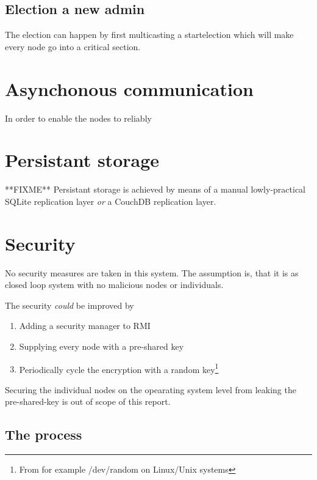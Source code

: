 \documentclass[10pt,a4paper]{article}
\begin{document}
\subsection{Election a new admin}
The election can happen by first multicasting a startelection which will make every node go into a critical section.

\section{Asynchonous communication}
In order to enable the nodes to reliably 

\section{Persistant storage}
**FIXME** Persistant storage is achieved by means of a manual lowly-practical SQLite replication layer \emph{or} a CouchDB replication layer.

\section{Security}
No security measures are taken in this system. The assumption is, that it is as closed loop system with no malicious nodes or individuals.

The security \emph{could} be improved by 
\begin{enumerate}
\item Adding a security manager to RMI
\item Supplying every node with a pre-shared key
\item Periodically cycle the encryption with a random key\footnote{From for example /dev/random on Linux/Unix systems}
\end{enumerate}
Securing the individual nodes on the opearating system level from leaking the pre-shared-key is out of scope of this report.

\subsection{The process}
\end{document}
